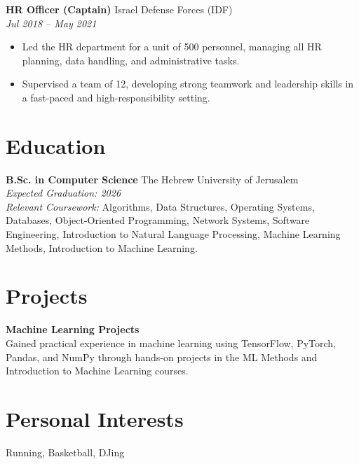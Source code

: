 \documentclass[a4paper,10pt]{article}
\begin{document}
\textbf{HR Officer (Captain)} \hfill Israel Defense Forces (IDF) \\
\textit{Jul 2018 -- May 2021}
\begin{itemize}[noitemsep,nolistsep]
    \item Led the HR department for a unit of 500 personnel, managing all HR planning, data handling, and administrative tasks.
    \item Supervised a team of 12, developing strong teamwork and leadership skills in a fast-paced and high-responsibility setting.
\end{itemize}

\section*{Education}
\textbf{B.Sc. in Computer Science} \hfill The Hebrew University of Jerusalem \\
\textit{Expected Graduation: 2026} \\
\textit{Relevant Coursework:} Algorithms, Data Structures, Operating Systems, Databases, Object-Oriented Programming, Network Systems, Software Engineering, Introduction to Natural Language Processing, Machine Learning Methods, Introduction to Machine Learning.

\section*{Projects}
\textbf{Machine Learning Projects} \\
Gained practical experience in machine learning using TensorFlow, PyTorch, Pandas, and NumPy through hands-on projects in the ML Methods and Introduction to Machine Learning courses.

\section*{Personal Interests}
Running, Basketball, DJing
\end{document}
